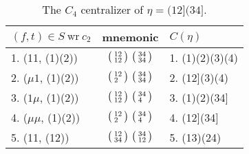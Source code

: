 \documentclass{surv-l}
\numberwithin{equation}{section}
\numberwithin{table}{section}
\numberwithin{figure}{section}
\theoremstyle{plain}
\theoremstyle{definition}
\begin{document}
\begin{table}[]
\caption{The $C_{4}$ centralizer of $\eta=(12](34]$.}\label{tab5.17.1}
{\begin{tabular}{@{}|l|c|l|@{}}
\hline
\multicolumn{1}{|l|}{$(f,t)\in S\ \mathrm{wr}\ c_{2}$}&  \multicolumn{1}{|l|}{mnemonic}& \multicolumn{1}{|l|}{$C(\eta)$} \\
\hline
1. (11, (1)(2))&$\big(\kern0.5pt\begin{smallmatrix}12 \\ 12\end{smallmatrix}\kern0.5pt\big)\ \big(\kern0.5pt\begin{smallmatrix}34 \\ 34\end{smallmatrix}\kern0.5pt\big)$&1. (1)(2)(3)(4) \\[3pt]
2. ($\mu 1$, (1)(2))&$\big(\kern0.5pt\begin{smallmatrix}12 \\ 2\phantom{3}\end{smallmatrix}\kern0.5pt\big)\ \big(\kern0.5pt\begin{smallmatrix}34 \\ 34\end{smallmatrix}\kern0.5pt\big)$&2. (12](3)(4) \\[3pt]
3. ($1\mu$, (1)(2))&$\big(\kern0.5pt\begin{smallmatrix}12 \\ 12\end{smallmatrix}\kern0.5pt\big)\ \big(\kern0.5pt\begin{smallmatrix}34 \\ 4\phantom{3}\end{smallmatrix}\kern0.5pt\big)$&3. (1)(2)(34] \\[3pt]
4. ($\mu\mu$, (1)(2))&$\big(\kern0.5pt\begin{smallmatrix}12 \\ 2\phantom{3}\end{smallmatrix}\kern0.5pt\big)\ \big(\kern0.5pt\begin{smallmatrix}34 \\ 4\phantom{3}\end{smallmatrix}\kern0.5pt\big)$&4. (12](34] \\[3pt]
5. (11, (12))&$\big(\kern0.5pt\begin{smallmatrix}12 \\ 34\end{smallmatrix}\kern0.5pt\big)\ \big(\kern0.5pt\begin{smallmatrix}34 \\ 12\end{smallmatrix}\kern0.5pt\big)$&5. (13)(24) \\[3pt]

\end{tabular}}
\end{table}
\end{document}
